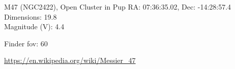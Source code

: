 \begin{block}{M47 (NGC2422), Open Cluster in Pup}
    RA: 07:36:35.02, Dec: -14:28:57.4 \\ 
    Dimensions: 19.8 \\ 
    Magnitude (V): 4.4



    Finder fov: 60 

    \url{https://en.wikipedia.org/wiki/Messier_47} 
\end{block}